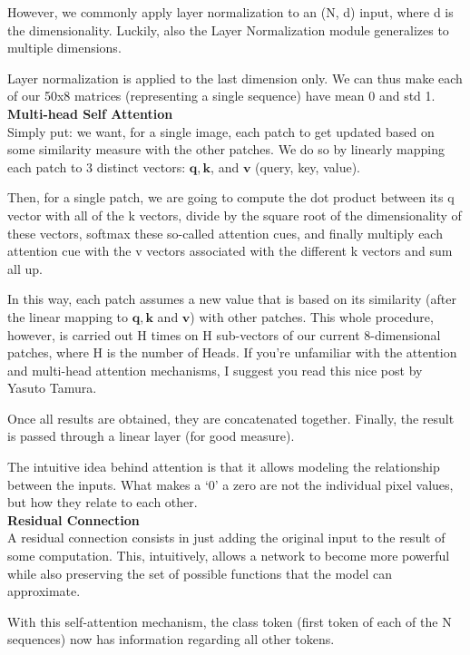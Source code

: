 However, we commonly apply layer normalization to an (N, d) input, where d is the dimensionality. Luckily, also the Layer Normalization module generalizes to multiple dimensions.

Layer normalization is applied to the last dimension only. We can thus make each of our 50x8 matrices (representing a single sequence) have mean 0 and std 1.\\

\textbf{Multi-head Self Attention} \\
Simply put: we want, for a single image, each patch to get updated based on some similarity measure with the other patches. We do so by linearly mapping each patch to 3 distinct vectors: \(\mathbf{q}, \mathbf{k}\), and \(\mathbf{v}\) (query, key, value).


Then, for a single patch, we are going to compute the dot product between its q vector with all of the k vectors, divide by the square root of the dimensionality of these vectors, softmax these so-called attention cues, and finally multiply each attention cue with the v vectors associated with the different k vectors and sum all up.

In this way, each patch assumes a new value that is based on its similarity (after the linear mapping to \(\mathbf{q}, \mathbf{k}\) and \(\mathbf{v}\)) with other patches. This whole procedure, however, is carried out H times on H sub-vectors of our current 8-dimensional patches, where H is the number of Heads. If you’re unfamiliar with the attention and multi-head attention mechanisms, I suggest you read this nice post by Yasuto Tamura.

Once all results are obtained, they are concatenated together. Finally, the result is passed through a linear layer (for good measure).

The intuitive idea behind attention is that it allows modeling the relationship between the inputs. What makes a ‘0’ a zero are not the individual pixel values, but how they relate to each other.\\

\textbf{Residual Connection} \\
A residual connection consists in just adding the original input to the result of some computation. This, intuitively, allows a network to become more powerful while also preserving the set of possible functions that the model can approximate.

With this self-attention mechanism, the class token (first token of each of the N sequences) now has information regarding all other tokens.\\

